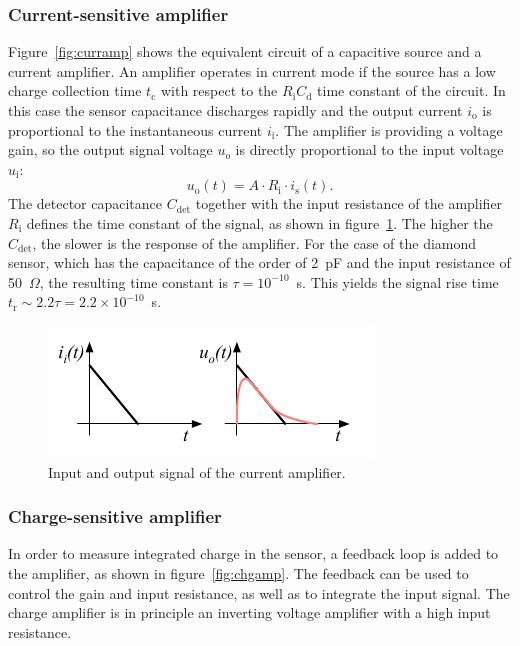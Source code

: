 \subsubsection{Current-sensitive amplifier}
Figure~\ref{fig:curramp} shows the equivalent circuit of a capacitive source and a current amplifier. An amplifier operates in current mode if the source has a low charge collection time $t_\mathrm{c}$ with respect to the $R_\mathrm{i}C_\mathrm{d}$ time constant of the circuit. In this case the sensor capacitance discharges rapidly and the output current $i_\mathrm{o}$ is proportional to the instantaneous current $i_\mathrm{i}$. The amplifier is providing a voltage gain, so the output signal voltage $u_o$ is directly proportional to the input voltage $u_\mathrm{i}$:
\begin{equation}
u_\mathrm{o}(t) = A \cdot R_\mathrm{i} \cdot i_\mathrm{s}(t).
\end{equation}
The detector capacitance $C_\mathrm{det}$ together with the input resistance of the amplifier $R_\mathrm{i}$ defines the time constant of the signal, as shown in figure~\ref{fig:currc}. The higher the $C_\mathrm{det}$, the slower is the response of the amplifier. For the case of the diamond sensor, which has the capacitance of the order of 2~pF and the input resistance of 50~$\Omega$, the resulting time constant is $\tau=10^{-10}$~s. This yields the signal rise time $t_\mathrm{r}\sim2.2\tau=2.2\times10^{-10}$~s.
\begin{figure}[!t]
\begin{center}
\includegraphics[width=0.8\linewidth]{02_pulse_formation/pics/plots/currrc}
\caption{Input and output signal of the current amplifier.}
\label{fig:currc}
\end{center}
\end{figure}




\subsubsection{Charge-sensitive amplifier}
In order to measure integrated charge in the sensor, a feedback loop is added to the amplifier, as shown in figure~\ref{fig:chgamp}. The feedback can be used to control the gain and input resistance, as well as to integrate the input signal. The charge amplifier is in principle an inverting voltage amplifier with a high input resistance. 
 
